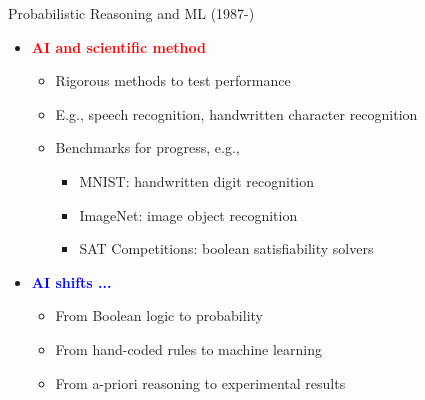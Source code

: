 \documentclass[
  10pt,
  ignorenonframetext,
]{beamer}
\providecommand{\tightlist}{%
  \setlength{\itemsep}{0pt}\setlength{\parskip}{0pt}}
\begin{document}
\begin{frame}{Probabilistic Reasoning and ML (1987-)}
\label{probabilistic-reasoning-and-ml-1987-}
\begin{itemize}
\tightlist
\item
  \textbf{\textcolor{red}{AI and scientific method}}

  \begin{itemize}
  \tightlist
  \item
    Rigorous methods to test performance
  \item
    E.g., speech recognition, handwritten character recognition
  \item
    Benchmarks for progress, e.g.,

    \begin{itemize}
    \tightlist
    \item
      MNIST: handwritten digit recognition
    \item
      ImageNet: image object recognition
    \item
      SAT Competitions: boolean satisfiability solvers
    \end{itemize}
  \end{itemize}
\item
  \textbf{\textcolor{blue}{AI shifts ...}}

  \begin{itemize}
  \tightlist
  \item
    From Boolean logic to probability
  \item
    From hand-coded rules to machine learning
  \item
    From a-priori reasoning to experimental results
  \end{itemize}
\end{itemize}
\end{frame}
\end{document}
